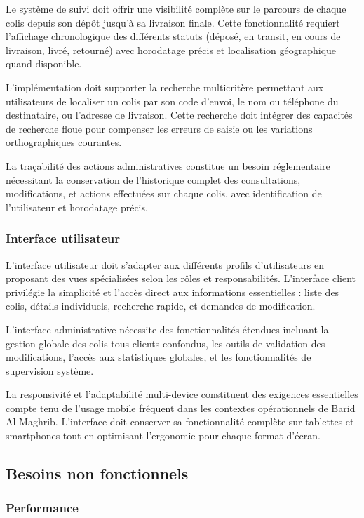 Le système de suivi doit offrir une visibilité complète sur le parcours de chaque colis depuis son dépôt jusqu'à sa livraison finale. Cette fonctionnalité requiert l'affichage chronologique des différents statuts (déposé, en transit, en cours de livraison, livré, retourné) avec horodatage précis et localisation géographique quand disponible.

L'implémentation doit supporter la recherche multicritère permettant aux utilisateurs de localiser un colis par son code d'envoi, le nom ou téléphone du destinataire, ou l'adresse de livraison. Cette recherche doit intégrer des capacités de recherche floue pour compenser les erreurs de saisie ou les variations orthographiques courantes.

La traçabilité des actions administratives constitue un besoin réglementaire nécessitant la conservation de l'historique complet des consultations, modifications, et actions effectuées sur chaque colis, avec identification de l'utilisateur et horodatage précis.

\subsubsection{Interface utilisateur}

L'interface utilisateur doit s'adapter aux différents profils d'utilisateurs en proposant des vues spécialisées selon les rôles et responsabilités. L'interface client privilégie la simplicité et l'accès direct aux informations essentielles : liste des colis, détails individuels, recherche rapide, et demandes de modification.

L'interface administrative nécessite des fonctionnalités étendues incluant la gestion globale des colis tous clients confondus, les outils de validation des modifications, l'accès aux statistiques globales, et les fonctionnalités de supervision système.

La responsivité et l'adaptabilité multi-device constituent des exigences essentielles compte tenu de l'usage mobile fréquent dans les contextes opérationnels de Barid Al Maghrib. L'interface doit conserver sa fonctionnalité complète sur tablettes et smartphones tout en optimisant l'ergonomie pour chaque format d'écran.

\subsection{Besoins non fonctionnels}

\subsubsection{Performance}

